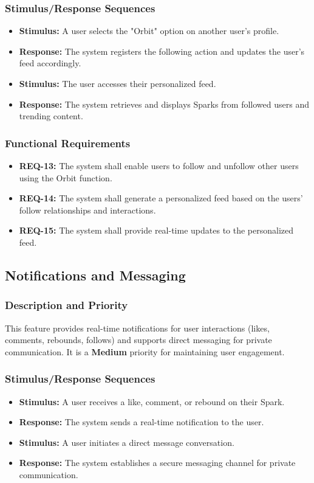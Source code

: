 \documentclass[a4paper,12pt]{article}
\begin{document}
\subsubsection{Stimulus/Response Sequences}
\begin{itemize}
    \item \textbf{Stimulus:} A user selects the "Orbit" option on another user's profile.
    \item \textbf{Response:} The system registers the following action and updates the user’s feed accordingly.
    \item \textbf{Stimulus:} The user accesses their personalized feed.
    \item \textbf{Response:} The system retrieves and displays Sparks from followed users and trending content.
\end{itemize}

\subsubsection{Functional Requirements}
\begin{itemize}
    \item \textbf{REQ-13:} The system shall enable users to follow and unfollow other users using the Orbit function.
    \item \textbf{REQ-14:} The system shall generate a personalized feed based on the users' follow relationships and interactions.
    \item \textbf{REQ-15:} The system shall provide real-time updates to the personalized feed.
\end{itemize}

\subsection{Notifications and Messaging}
\subsubsection{Description and Priority}
This feature provides real-time notifications for user interactions (likes, comments, rebounds, follows) and supports direct messaging for private communication. It is a \textbf{Medium} priority for maintaining user engagement.

\subsubsection{Stimulus/Response Sequences}
\begin{itemize}
    \item \textbf{Stimulus:} A user receives a like, comment, or rebound on their Spark.
    \item \textbf{Response:} The system sends a real-time notification to the user.
    \item \textbf{Stimulus:} A user initiates a direct message conversation.
    \item \textbf{Response:} The system establishes a secure messaging channel for private communication.
\end{itemize}
\end{document}
